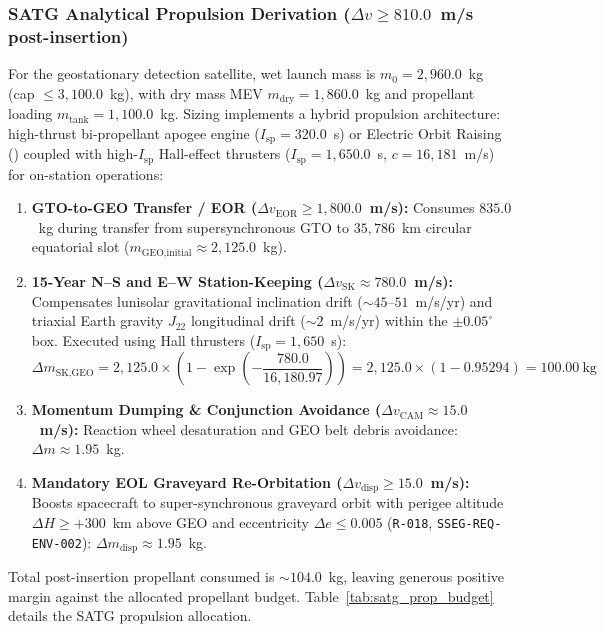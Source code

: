 \subsubsection{SATG Analytical Propulsion Derivation ($\Delta v \ge 810.0$~m/s post-insertion)}

For the geostationary detection satellite, wet launch mass is $m_0 = 2{,}960.0$~kg (cap $\le 3{,}100.0$~kg), with dry mass MEV $m_{\text{dry}} = 1{,}860.0$~kg and propellant loading $m_{\text{tank}} = 1{,}100.0$~kg. Sizing implements a hybrid propulsion architecture: high-thrust bi-propellant apogee engine ($I_{\text{sp}} = 320.0$~s) or Electric Orbit Raising () coupled with high-$I_{\text{sp}}$ Hall-effect thrusters ($I_{\text{sp}} = 1{,}650.0$~s, $c = 16{,}181$~m/s) for on-station operations:
\begin{enumerate}
    \item \textbf{GTO-to-GEO Transfer / EOR ($\Delta v_{\text{EOR}} \ge 1{,}800.0$~m/s):} Consumes $835.0$~kg during transfer from supersynchronous GTO to $35{,}786$~km circular equatorial slot ($m_{\text{GEO,initial}} \approx 2{,}125.0$~kg).
    \item \textbf{15-Year N--S and E--W Station-Keeping ($\Delta v_{\text{SK}} \approx 780.0$~m/s):} Compensates lunisolar gravitational inclination drift (${\sim}45\text{--}51$~m/s/yr) and triaxial Earth gravity $J_{22}$ longitudinal drift (${\sim}2$~m/s/yr) within the $\pm 0.05^\circ$ box. Executed using Hall thrusters ($I_{\text{sp}} = 1{,}650$~s):
    \begin{equation}
        \Delta m_{\text{SK,GEO}} = 2{,}125.0 \times \left(1 - \exp\left(-\frac{780.0}{16{,}180.97}\right)\right) = 2{,}125.0 \times (1 - 0.95294) = 100.00~\text{kg}
    \end{equation}
    \item \textbf{Momentum Dumping \& Conjunction Avoidance ($\Delta v_{\text{CAM}} \approx 15.0$~m/s):} Reaction wheel desaturation and GEO belt debris avoidance: $\Delta m \approx 1.95$~kg.
    \item \textbf{Mandatory EOL Graveyard Re-Orbitation ($\Delta v_{\text{disp}} \ge 15.0$~m/s):} Boosts spacecraft to super-synchronous graveyard orbit with perigee altitude $\Delta H \ge +300$~km above GEO and eccentricity $\Delta e \le 0.005$ (\texttt{R-018}, \texttt{SSEG-REQ-ENV-002}): $\Delta m_{\text{disp}} \approx 1.95$~kg.
\end{enumerate}
Total post-insertion propellant consumed is $\sim 104.0$~kg, leaving generous positive margin against the allocated propellant budget. Table~\ref{tab:satg_prop_budget} details the SATG propulsion allocation.

